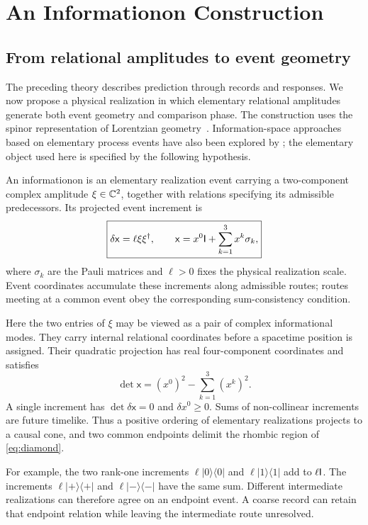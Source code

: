 \section{An Informationon Construction}
\label{sec:informationons}
\subsection{From relational amplitudes to event geometry}
The preceding theory describes prediction through records and responses. We now propose a physical realization in which elementary relational amplitudes generate both event geometry and comparison phase. The construction uses the spinor representation of Lorentzian geometry~\citep{penrose1960}. Information-space approaches based on elementary process events have also been explored by \citet{sulis2014}; the elementary object used here is specified by the following hypothesis.

\begin{hypothesis}
An informationon is an elementary realization event carrying a two-component complex amplitude \(\xi\in\mathbb C^2\), together with relations specifying its admissible predecessors. Its projected event increment is
\begin{equation}
\boxed{\delta\mathsf x=\ell\xi\xi^\dagger,
\qquad \mathsf x=x^0\mathsf I+\sum_{k=1}^3x^k\sigma_k,}
\label{eq:infoon}
\end{equation}
where \(\sigma_k\) are the Pauli matrices and \(\ell>0\) fixes the physical realization scale. Event coordinates accumulate these increments along admissible routes; routes meeting at a common event obey the corresponding sum-consistency condition.
\end{hypothesis}

Here the two entries of \(\xi\) may be viewed as a pair of complex informational modes. They carry internal relational coordinates before a spacetime position is assigned. Their quadratic projection has real four-component coordinates and satisfies
\begin{equation}
\det\mathsf x=(x^0)^2-\sum_{k=1}^3(x^k)^2.
\label{eq:interval}
\end{equation}
A single increment has \(\det\delta\mathsf x=0\) and \(\delta x^0\ge0\). Sums of non-collinear increments are future timelike. Thus a positive ordering of elementary realizations projects to a causal cone, and two common endpoints delimit the rhombic region of \cref{eq:diamond}.

For example, the two rank-one increments \(\ell|0\rangle\langle0|\) and \(\ell|1\rangle\langle1|\) add to \(\ell\mathsf I\). The increments \(\ell|+\rangle\langle+|\) and \(\ell|-\rangle\langle-|\) have the same sum. Different intermediate realizations can therefore agree on an endpoint event. A coarse record can retain that endpoint relation while leaving the intermediate route unresolved.

